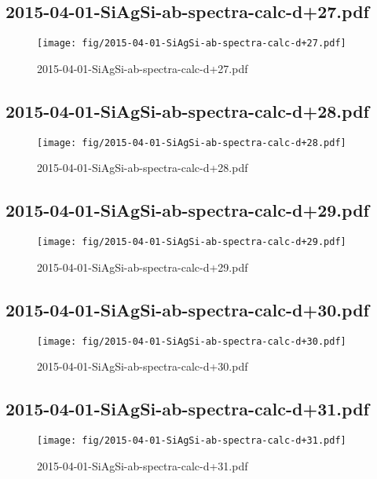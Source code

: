 \documentclass[fullscreen=true]{beamer}
\begin{document}
\subsection{2015-04-01-SiAgSi-ab-spectra-calc-d+27.pdf}
\begin{frame}
  \begin{figure}
    \texttt{[image: fig/2015-04-01-SiAgSi-ab-spectra-calc-d+27.pdf]}%
    \caption{2015-04-01-SiAgSi-ab-spectra-calc-d+27.pdf}
  \end{figure}
\end{frame}

\subsection{2015-04-01-SiAgSi-ab-spectra-calc-d+28.pdf}
\begin{frame}
  \begin{figure}
    \texttt{[image: fig/2015-04-01-SiAgSi-ab-spectra-calc-d+28.pdf]}%
    \caption{2015-04-01-SiAgSi-ab-spectra-calc-d+28.pdf}
  \end{figure}
\end{frame}

\subsection{2015-04-01-SiAgSi-ab-spectra-calc-d+29.pdf}
\begin{frame}
  \begin{figure}
    \texttt{[image: fig/2015-04-01-SiAgSi-ab-spectra-calc-d+29.pdf]}%
    \caption{2015-04-01-SiAgSi-ab-spectra-calc-d+29.pdf}
  \end{figure}
\end{frame}

\subsection{2015-04-01-SiAgSi-ab-spectra-calc-d+30.pdf}
\begin{frame}
  \begin{figure}
    \texttt{[image: fig/2015-04-01-SiAgSi-ab-spectra-calc-d+30.pdf]}%
    \caption{2015-04-01-SiAgSi-ab-spectra-calc-d+30.pdf}
  \end{figure}
\end{frame}

\subsection{2015-04-01-SiAgSi-ab-spectra-calc-d+31.pdf}
\begin{frame}
  \begin{figure}
    \texttt{[image: fig/2015-04-01-SiAgSi-ab-spectra-calc-d+31.pdf]}%
    \caption{2015-04-01-SiAgSi-ab-spectra-calc-d+31.pdf}
  \end{figure}
\end{frame}
\end{document}
